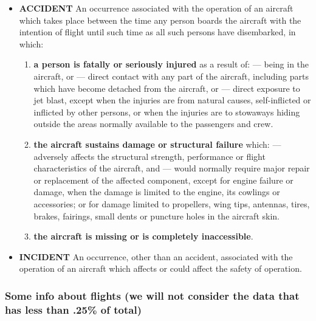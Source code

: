 \documentclass[]{article}
\providecommand{\tightlist}{%
  \setlength{\itemsep}{0pt}\setlength{\parskip}{0pt}}
\begin{document}
\begin{itemize}
\tightlist
\item
  \textbf{ACCIDENT} An occurrence associated with the operation of an
  aircraft which takes place between the time any person boards the
  aircraft with the intention of flight until such time as all such
  persons have disembarked, in which:

  \begin{enumerate}
  \def\labelenumi{\alph{enumi})}
  \tightlist
  \item
    \textbf{a person is fatally or seriously injured} as a result of:
    --- being in the aircraft, or --- direct contact with any part of
    the aircraft, including parts which have become detached from the
    aircraft, or --- direct exposure to jet blast, except when the
    injuries are from natural causes, self-inflicted or inflicted by
    other persons, or when the injuries are to stowaways hiding outside
    the areas normally available to the passengers and crew.
  \item
    \textbf{the aircraft sustains damage or structural failure} which:
    --- adversely affects the structural strength, performance or flight
    characteristics of the aircraft, and --- would normally require
    major repair or replacement of the affected component, except for
    engine failure or damage, when the damage is limited to the engine,
    its cowlings or accessories; or for damage limited to propellers,
    wing tips, antennas, tires, brakes, fairings, small dents or
    puncture holes in the aircraft skin.
  \item
    \textbf{the aircraft is missing or is completely inaccessible}.
  \end{enumerate}
\item
  \textbf{INCIDENT} An occurrence, other than an accident, associated
  with the operation of an aircraft which affects or could affect the
  safety of operation.
\end{itemize}

\hypertarget{some-info-about-flights-we-will-not-consider-the-data-that-has-less-than-.25-of-total}{%
\subsubsection{Some info about flights (we will not consider the data
that has less than .25\% of
total)}\label{some-info-about-flights-we-will-not-consider-the-data-that-has-less-than-.25-of-total}}
\end{document}
